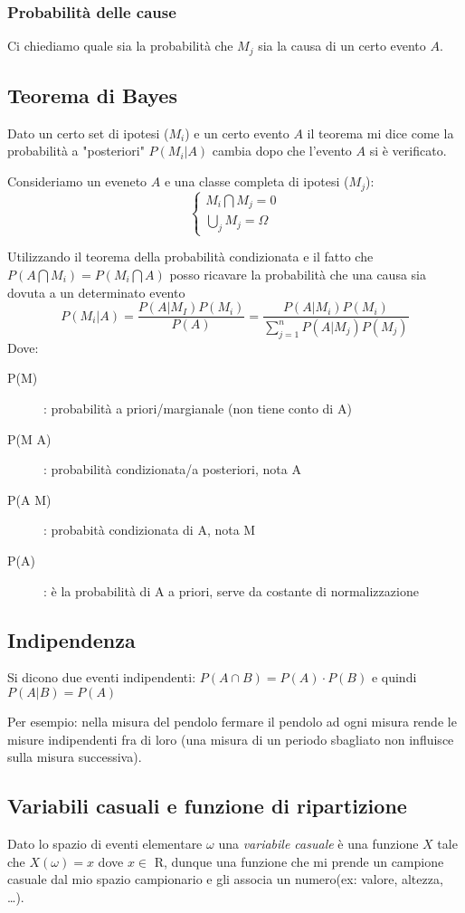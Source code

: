 \documentclass{article}
\begin{document}
\subsubsection{Probabilità delle cause}
Ci chiediamo quale sia la probabilità che $M_j$ sia la causa di un certo evento $A$.


\subsection{Teorema di Bayes }
Dato un certo set di ipotesi ($M_i$) e un certo evento $A$ il teorema mi dice come la probabilità a "posteriori" $P(M_i|A)$ cambia dopo che l'evento $A$ si è verificato.

Consideriamo un eveneto $A$ e una classe completa di ipotesi ($M_j$):
\[
\begin{cases}
    M_i\bigcap M_j=0 \\
    \bigcup_j M_j=\Omega
\end{cases}
\]
 
Utilizzando il teorema della probabilità condizionata e il fatto che $P(A \bigcap M_i)=P(M_i \bigcap A)$ posso ricavare la probabilità che una causa sia dovuta a un determinato evento
\[
P(M_i|A)=\frac{P(A|M_I)P(M_i)}{P(A)}=\frac{P(A|M_i)P(M_i)}{\sum_{j=1}^{n}P(A|M_j)P(M_j)}
\]
Dove:
\begin{description}
    \item[P(M)]: probabilità a priori/margianale (non tiene conto di A)
    \item [P(M \textbar \space A)]: probabilità condizionata/a posteriori, nota A
    \item [P(A \textbar \space M)]: probabità condizionata di A, nota M
    \item [P(A)]: è la probabilità di A a priori, serve da costante di normalizzazione
\end{description}




\subsection{Indipendenza}
Si dicono due eventi indipendenti: $P(A \cap B)=P(A) \cdot P(B)$ e quindi $P(A|B)=P(A)$ 

Per esempio: nella misura del pendolo fermare il pendolo ad ogni misura rende le misure indipendenti fra di loro (una misura di un periodo sbagliato non influisce sulla misura successiva).

\subsection{Variabili casuali e funzione di ripartizione}
Dato lo spazio di eventi elementare $\omega$ una \textit{variabile casuale} è una funzione $X$ tale che $X(\omega)=x$ dove $x\in$ R,
dunque una funzione che mi prende un campione casuale dal mio spazio campionario e gli associa un numero(ex: valore, altezza, \ldots).
\end{document}
